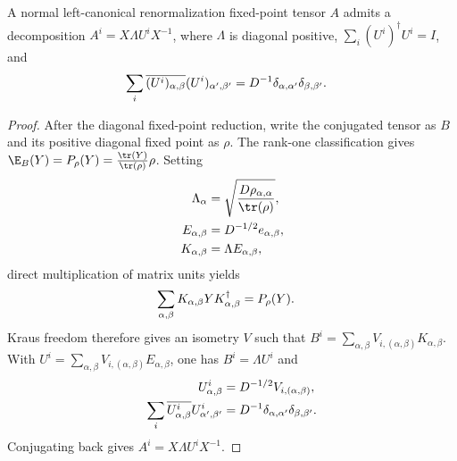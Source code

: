 \begin{lemma}%
    \label{thm:rfp_nt_structural_full}
    \leanok
    A normal left-canonical renormalization fixed-point tensor $A$ admits a
    decomposition $A^i=X\Lambda U^iX^{-1}$, where
    $\Lambda$ is diagonal positive, $\sum_i (U^i)^\dagger U^i=I$, and
    \begin{align}
        \sum_i \overline{(U^i)_{\alpha,\beta}}
        (U^i)_{\alpha',\beta'}
         & =
        D^{-1}\delta_{\alpha,\alpha'}\delta_{\beta,\beta'}.
        \notag
    \end{align}
\end{lemma}
\begin{proof}\leanok
    After the diagonal fixed-point reduction, write the conjugated tensor as
    $B$ and its positive diagonal fixed point as $\rho$. The rank-one
    classification gives
    $\E_B(Y)=P_\rho(Y)=\frac{\tr(Y)}{\tr(\rho)}\rho$.
    Setting
    \begin{align}
        \Lambda_\alpha
         & =\sqrt{\frac{D\rho_{\alpha,\alpha}}{\tr(\rho)}},
        \notag                                              \\
        E_{\alpha,\beta}
         & =D^{-1/2}e_{\alpha,\beta},
        \notag                                              \\
        K_{\alpha,\beta}
         & =\Lambda E_{\alpha,\beta},
        \notag
    \end{align}
    direct multiplication of matrix units yields
    \begin{align}
        \sum_{\alpha,\beta}K_{\alpha,\beta}Y
        K_{\alpha,\beta}^{\dagger}
         & =P_\rho(Y).
        \notag
    \end{align}
    Kraus freedom therefore gives an isometry $V$ such that
    $B^i=\sum_{\alpha,\beta}V_{i,(\alpha,\beta)}K_{\alpha,\beta}$.
    With
    $U^i=\sum_{\alpha,\beta}V_{i,(\alpha,\beta)}E_{\alpha,\beta}$,
    one has $B^i=\Lambda U^i$ and
    \begin{align}
        U^i_{\alpha,\beta}
         & =D^{-1/2}V_{i,(\alpha,\beta)},
        \notag                                                  \\
        \sum_i\overline{U^i_{\alpha,\beta}}U^i_{\alpha',\beta'}
         & =D^{-1}\delta_{\alpha,\alpha'}\delta_{\beta,\beta'}.
        \notag
    \end{align}
    Conjugating back gives $A^i=X\Lambda U^iX^{-1}$.
\end{proof}

